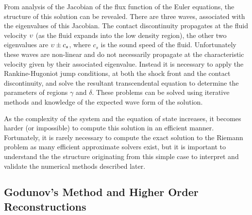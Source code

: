 From analysis of the Jacobian of the flux function of the Euler equations, the structure of this solution can be revealed.
There are three waves, associated with the eigenvalues of this Jacobian.
The contact discontinuity propagates at the fluid velocity $\upsilon$ (as the fluid expands into the low density region), the other two eigenvalues are $\upsilon\pm c_s$, where $c_s$ is the sound speed of the fluid.
Unfortunately these waves are non-linear and do not necessarily propagate at the characteristic velocity given by their associated eigenvalue.
Instead it is necessary to apply the Rankine-Hugoniot jump conditions, at both the shock front and the contact discontinuity, and solve the resultant transcendental equation to determine the parameters of regions $\gamma$ and $\delta$.
These problems can be solved using iterative methods and knowledge of the expected wave form of the solution.

As the complexity of the system and the equation of state increases, it becomes harder (or impossible) to compute this solution in an efficient manner.
Fortunately, it is rarely necessary to compute the exact solution to the Riemann problem as many efficient approximate solvers exist, but it is important to understand the the structure originating from this simple case to interpret and validate the numerical methods described later.


\subsection{Godunov's Method and Higher Order Reconstructions}

